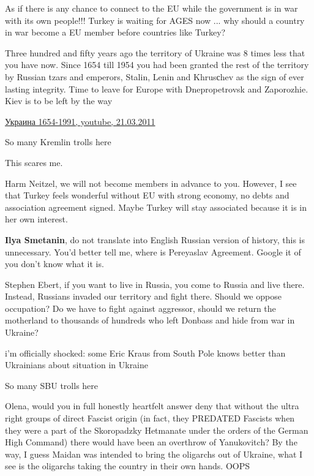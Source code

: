 \begin{itemize}
\begin{itemize}

As if there is any chance to connect to the EU while the government is in war
with its own people!!! Turkey is waiting for AGES now ... why should a country
in war become a EU member before countries like Turkey?


Three hundred and fifty years ago the territory of Ukraine was 8 times less
that you have now. Since 1654 till 1954 you had been granted the rest of the
territory by Russian tzars and emperors, Stalin, Lenin and Khrusсhev as the
sign of ever lasting integrity. Time to leave for Europe with Dnepropetrovsk
and Zaporozhie. Kiev is to be left by the way

\href{https://www.youtube.com/watch?v=3b_OzQUbZ_w}{%
Украина 1654-1991, youtube, 21.03.2011%
}

So many Kremlin trolls here

This scares me.


Harm Neitzel, we will not become members in advance to you. However, I see that
Turkey feels wonderful without EU with strong economy, no debts and association
agreement signed. Maybe Turkey will stay associated because it is in her own
interest.

\textbf{Ilya Smetanin}, do not translate into English Russian version of
history, this is unnecessary. You'd better tell me, where is Pereyaslav
Agreement. Google it of you don't know what it is.


Stephen Ebert, if you want to live in Russia, you come to Russia and live
there. Instead, Russians invaded our territory and fight there. Should we
oppose occupation? Do we have to fight against aggressor, should we return the
motherland to thousands of hundreds who left Donbass and hide from war in
Ukraine?


i'm officially shocked: some Eric Kraus from South Pole knows better than Ukrainians about situation in Ukraine

So many SBU trolls here


Olena, would you in full honestly heartfelt answer deny that without the ultra
right groups of direct Fascist origin (in fact, they PREDATED Fascists when
they were a part of the Skoropadzky Hetmanate under the orders of the German
High Command) there would have been an overthrow of Yanukovitch? By the way, I
guess Maidan was intended to bring the oligarchs out of Ukraine, what I see is
the oligarchs taking the country in their own hands. OOPS


\end{itemize}
\end{itemize}
